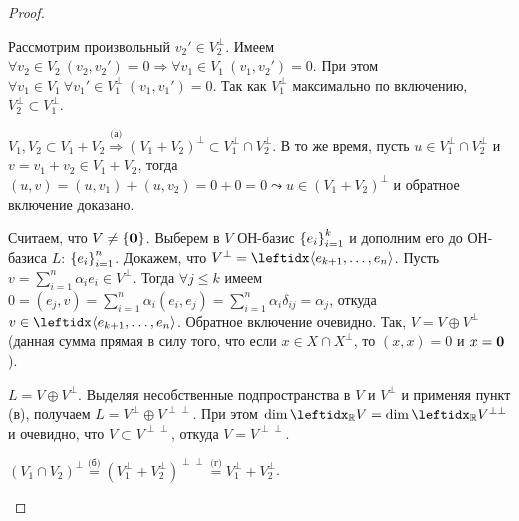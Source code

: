 \begin{proof}
    \begin{proofpart}
        Рассмотрим произвольный $v_2' \in V_2^\perp$. Имеем $\forall v_2 \in V_2\ (v_2, v_2') = 0 \Rightarrow \forall v_1 \in V_1\ (v_1, v_2') = 0$. При этом $\forall v_1 \in V_1\ \forall v_1' \in V_1^\perp\ (v_1, v_1') = 0$. Так как $V_1^\perp$ максимально по включению, $V_2^\perp \subset V_1^\perp$.
    \end{proofpart}

    \begin{proofpart}
        $V_1, V_2 \subset V_1 + V_2 \stackrel{\text{(а)}}{\Rightarrow} (V_1 + V_2)^\perp \subset V_1^\perp \cap V_2^\perp$. В то же время, пусть $u \in V_1^\perp \cap V_2^\perp$ и $v = v_1 + v_2 \in V_1 + V_2$, тогда $(u, v) = (u, v_1) + (u, v_2) = 0 + 0 = 0 \leadsto u \in (V_1 + V_2)^\perp$ и обратное включение доказано.
    \end{proofpart}

    \begin{proofpart}
        Считаем, что $V \neq \{\mathbf{0}\}$. Выберем в $V$ ОН-базис $\left\{e_i\right\}_{i=1}^{k}$ и дополним его до ОН-базиса $L$: $\left\{e_i\right\}_{i=1}^{n}$. Докажем, что $V^\perp = \gen{}{e_{k+1}, \dots, e_n}$. Пусть $v = \sum_{i=1}^n \alpha_i e_i \in V^\perp$. Тогда $\forall j \le k$ имеем $0 = (e_j, v) = \sum_{i=1}^n \alpha_i (e_i, e_j) = \sum_{i=1}^n \alpha_i \delta_{ij} = \alpha_j$, откуда $v \in \gen{}{e_{k+1}, \dots, e_n}$. Обратное включение очевидно. Так, $V = V \oplus V^\perp$ (данная сумма прямая в силу того, что если $x \in X \cap X^\perp$, то $(x, x) = 0$ и $x = \mathbf{0}$).
    \end{proofpart}

    \begin{proofpart}
        $L = V \oplus V^\perp$. Выделяя несобственные подпространства в $V$ и $V^\perp$ и применяя пункт (в), получаем $L = V^\perp \oplus V^{\perp\perp}$. При этом $\dim \lsub{\mathbb{R}}{V} = \dim \lsub{\mathbb{R}}{V^{\perp\perp}}$ и очевидно, что $V \subset V^{\perp\perp}$, откуда $V = V^{\perp\perp}$.
    \end{proofpart}

    \begin{proofpart}
        $(V_1 \cap V_2)^\perp \stackrel{\text{(б)}}{=} (V_1^\perp + V_2^\perp)^{\perp\perp} \stackrel{\text{(г)}}{=} V_1^\perp + V_2^\perp$.
    \end{proofpart}
\end{proof}